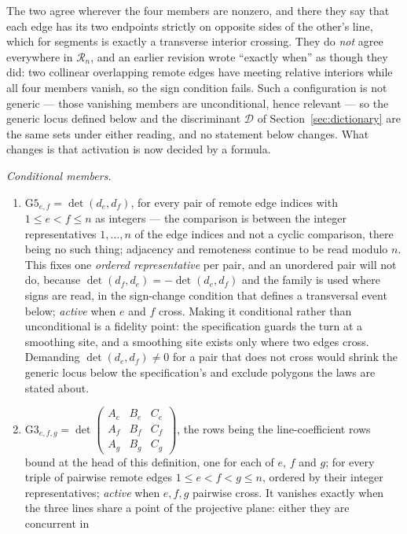 \begin{definition}
The two agree wherever the four members are nonzero, and there they say that
each edge has its two endpoints strictly on opposite sides of the other's line,
which for segments is exactly a transverse interior crossing. They do
\emph{not} agree everywhere in $\mathcal R_n$, and an earlier revision wrote
``exactly when'' as though they did: two collinear overlapping remote edges have
meeting relative interiors while all four members vanish, so the sign condition
fails. Such a configuration is not generic --- those vanishing members are
unconditional, hence relevant --- so the generic locus defined below and the
discriminant $\mathcal D$ of Section~\ref{sec:dictionary} are the same sets under
either reading, and no statement
below changes. What changes is that activation is now decided by a formula.

\emph{Conditional members.}
\begin{enumerate}
\item[(G5)] $\mathrm{G5}_{e,f}=\det(d_e,d_f)$, for every pair of remote edge
indices with $1\leq e<f\leq n$ as integers --- the comparison is between the
integer representatives $1,\dots,n$ of the edge indices and not a cyclic
comparison, there being no such thing; adjacency and remoteness continue to be
read modulo $n$. This fixes one \emph{ordered representative} per pair, and an
unordered pair will not do, because
$\det(d_f,d_e)=-\det(d_e,d_f)$ and the family is used where signs are read, in
the sign-change condition that defines a transversal event below; \emph{active} when $e$
and $f$ cross. Making it
conditional rather than unconditional is a fidelity point: the specification
guards the turn at a smoothing site, and a smoothing site exists only where two
edges cross. Demanding $\det(d_e,d_f)\neq0$ for a pair that does not cross
would shrink the generic locus below the specification's and exclude polygons
the laws are stated about.
\item[(G3)] $\mathrm{G3}_{e,f,g}=\det\begin{pmatrix}A_e&B_e&C_e\\
A_f&B_f&C_f\\ A_g&B_g&C_g\end{pmatrix}$, the rows being the line-coefficient
rows bound at the head of this definition, one for each of $e$, $f$ and $g$;
for every triple of pairwise remote edges $1\leq e<f<g\leq n$, ordered by their
integer representatives; \emph{active} when $e,f,g$ pairwise cross. It vanishes exactly when the
three lines share a point of the projective plane: either they are concurrent in

\end{enumerate}
\end{definition}

